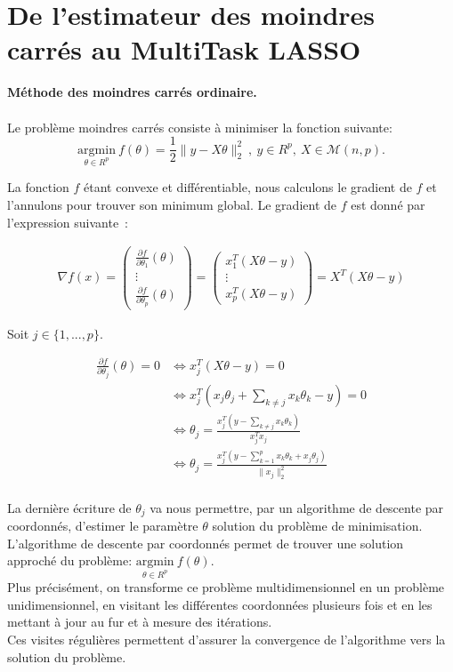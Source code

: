 \documentclass{article}
\begin{document}
\section*{De l'estimateur des moindres carrés au MultiTask LASSO} \vspace{.5cm}

\textbf{Méthode des moindres carrés ordinaire.} \\
\\ Le problème moindres carrés consiste à minimiser la fonction suivante: \\
$$\underset{\theta\in R^p}{\mathrm{argmin}} \ f(\theta)=\frac{1}{2} {\| y - X\theta\|_2^2} \
, \ y \in R^p,\ X \in \mathcal{M}(n,p).
 $$
 
La fonction $f$ étant convexe et différentiable, nous calculons le gradient de $f$ et l'annulons pour trouver son minimum global.
Le gradient de $f$ est donné par l'expression suivante\ :

\begin{align*}
    \nabla f(x) = \begin{pmatrix}
        \frac{\partial f}{\partial \theta_1} (\theta) \\ \vdots \\ \frac{\partial f}{\partial \theta_p} (\theta)
    \end{pmatrix}= \begin{pmatrix}
        x_1^T(X \theta -y) \\ \vdots \\ x_p^T(X \theta -y)
    \end{pmatrix} =X^T(X \theta -y)
\end{align*}

Soit $j \in \{1, ... ,p \}.$
	 
\begin{align*}
    \frac{\partial f}{\partial \theta_j} (\theta) = 0     &\Longleftrightarrow x_j^T(X \theta -y)= 0\\
     &\Longleftrightarrow x_j^T(x_j\theta_j + \sum_{k \ne j} x_k\theta_k - y) = 0\\ &\Longleftrightarrow \theta_j = \frac{x_j^T(y -  \sum_{k \ne j} x_k\theta_k)}{x_j^Tx_j} \\ &\Longleftrightarrow \theta_j = \frac{x_j^T(y -  \sum_{k=1}^{p} x_k\theta_k  + x_j\theta_j)}{\| x_j\|_2^2}
\end{align*} \\

La dernière écriture de $\theta_j$ va nous permettre, par un algorithme de descente par coordonnés, d'estimer le paramètre $\theta$ solution du problème de minimisation. \\

L'algorithme de descente par coordonnés permet de trouver une solution approché du problème: $\underset{\theta\in R^p}{\mathrm{argmin}} \ f(\theta).$  \\

Plus précisément, on transforme ce problème multidimensionnel en un problème unidimensionnel, en visitant les différentes coordonnées plusieurs fois et en les mettant à jour au fur et à mesure des itérations.\\
Ces visites régulières permettent d'assurer la convergence de l'algorithme vers la solution du problème.
\end{document}
